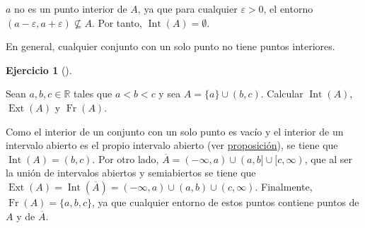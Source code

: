 \documentclass[
  a4paper,
]{scrreport}
\theoremstyle{definition}
\newtheorem{exercise}{Ejercicio}[chapter]
\theoremstyle{remark}
\begin{document}
\begin{tcolorbox}[enhanced jigsaw, coltitle=black, toptitle=1mm, colframe=quarto-callout-tip-color-frame, colbacktitle=quarto-callout-tip-color!10!white, breakable, opacityback=0, bottomtitle=1mm, opacitybacktitle=0.6, title=\textcolor{quarto-callout-tip-color}{\faLightbulb}\hspace{0.5em}{Solución}, arc=.35mm, leftrule=.75mm, toprule=.15mm, titlerule=0mm, bottomrule=.15mm, left=2mm, rightrule=.15mm, colback=white]

\(a\) no es un punto interior de \(A\), ya que para cualquier
\(\varepsilon>0\), el entorno
\((a-\varepsilon, a+\varepsilon)\not\subseteq A\). Por tanto,
\(\operatorname{Int}(A)=\emptyset\).

En general, cualquier conjunto con un solo punto no tiene puntos
interiores.

\end{tcolorbox}

\begin{exercise}[]\protect\hypertarget{exr-interior-exterior-frontera}{}\label{exr-interior-exterior-frontera}

Sean \(a,b,c\in\mathbb{R}\) tales que \(a<b<c\) y sea
\(A=\{a\}\cup (b,c)\). Calcular \(\operatorname{Int}(A)\),
\(\operatorname{Ext}(A)\) y \(\operatorname{Fr}(A)\).

\end{exercise}

\begin{tcolorbox}[enhanced jigsaw, coltitle=black, toptitle=1mm, colframe=quarto-callout-tip-color-frame, colbacktitle=quarto-callout-tip-color!10!white, breakable, opacityback=0, bottomtitle=1mm, opacitybacktitle=0.6, title=\textcolor{quarto-callout-tip-color}{\faLightbulb}\hspace{0.5em}{Solución}, arc=.35mm, leftrule=.75mm, toprule=.15mm, titlerule=0mm, bottomrule=.15mm, left=2mm, rightrule=.15mm, colback=white]

Como el interior de un conjunto con un solo punto es vacío y el interior
de un intervalo abierto es el propio intervalo abierto (ver
\href{https://aprendeconalf.es/analisis-manual/03-topologia-reales.html\#prp-interior-intervalo-abierto}{proposición}),
se tiene que \(\operatorname{Int}(A)=(b,c)\). Por otro lado,
\(\overline{A}=(-\infty,a)\cup (a,b]\cup [c,\infty)\), que al ser la
unión de intervalos abiertos y semiabiertos se tiene que
\(\operatorname{Ext}(A)=\operatorname{Int}(\overline{A})=(-\infty,a)\cup (a,b)\cup (c,\infty)\).
Finalmente, \(\operatorname{Fr}(A)=\{a,b,c\}\), ya que cualquier entorno
de estos puntos contiene puntos de \(A\) y de \(\overline{A}\).

\end{tcolorbox}
\end{document}
